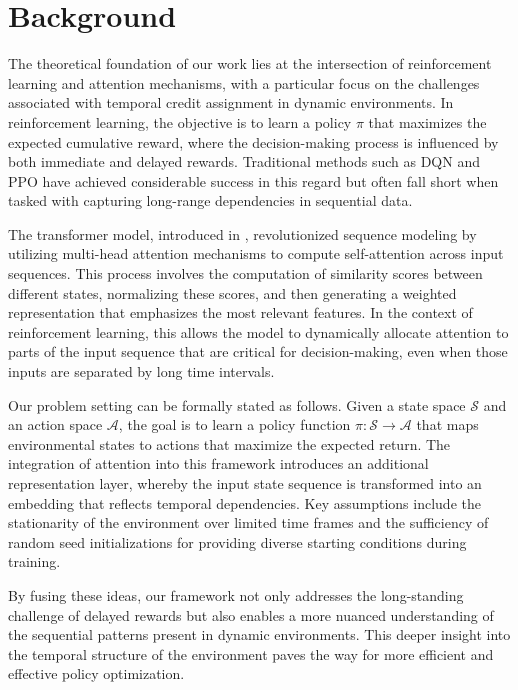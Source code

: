 \documentclass{article}
\begin{document}
\section{Background}
The theoretical foundation of our work lies at the intersection of reinforcement learning and attention mechanisms, with a particular focus on the challenges associated with temporal credit assignment in dynamic environments. In reinforcement learning, the objective is to learn a policy $\pi$ that maximizes the expected cumulative reward, where the decision-making process is influenced by both immediate and delayed rewards. Traditional methods such as DQN  and PPO  have achieved considerable success in this regard but often fall short when tasked with capturing long-range dependencies in sequential data. 

The transformer model, introduced in \cite{ashish_2017_attention}, revolutionized sequence modeling by utilizing multi-head attention mechanisms to compute self-attention across input sequences. This process involves the computation of similarity scores between different states, normalizing these scores, and then generating a weighted representation that emphasizes the most relevant features. In the context of reinforcement learning, this allows the model to dynamically allocate attention to parts of the input sequence that are critical for decision-making, even when those inputs are separated by long time intervals.

Our problem setting can be formally stated as follows. Given a state space $\mathcal{S}$ and an action space $\mathcal{A}$, the goal is to learn a policy function $\pi\colon \mathcal{S}\to \mathcal{A}$ that maps environmental states to actions that maximize the expected return. The integration of attention into this framework introduces an additional representation layer, whereby the input state sequence is transformed into an embedding that reflects temporal dependencies. Key assumptions include the stationarity of the environment over limited time frames and the sufficiency of random seed initializations for providing diverse starting conditions during training. 

By fusing these ideas, our framework not only addresses the long-standing challenge of delayed rewards but also enables a more nuanced understanding of the sequential patterns present in dynamic environments. This deeper insight into the temporal structure of the environment paves the way for more efficient and effective policy optimization.
\end{document}
